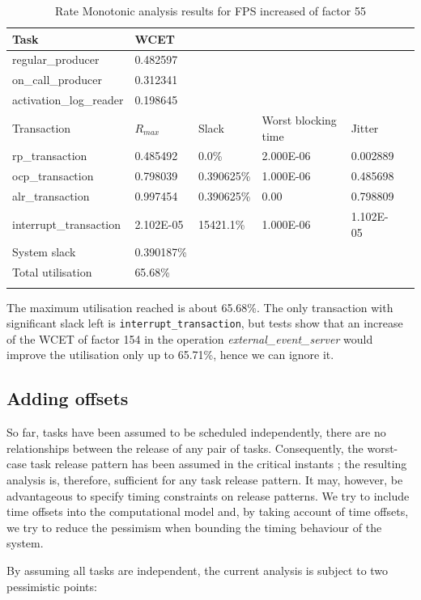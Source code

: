 \documentclass{article}
\begin{document}
\begin{longtable}{llllll}
   \toprule
   Task & WCET \\
   \midrule
   regular\_producer & 0.482597 \\
   on\_call\_producer & 0.312341 \\
   activation\_log\_reader & 0.198645 \\
   \toprule
   \toprule
   Transaction & $R_{max}$ & Slack & Worst blocking time & Jitter \\
   \midrule
   rp\_transaction & 0.485492  & 0.0\% &  2.000E-06 & 0.002889 \\
   ocp\_transaction & 0.798039 & 0.390625\% & 1.000E-06 & 0.485698 \\
   alr\_transaction & 0.997454 & 0.390625\% & 0.00 & 0.798809 \\
   interrupt\_transaction & 2.102E-05 & 15421.1\% & 1.000E-06 & 1.102E-05 \\
   \toprule
   \toprule
   System slack & 0.390187\% \\
   Total utilisation & 65.68\% \\
   \bottomrule
   \caption{Rate Monotonic analysis results for FPS increased of factor 55}
\label{tab:rm-fps-24-ocp-44-alr-56}
\end{longtable}

The maximum utilisation reached is about 65.68\%. The only transaction with significant slack left is \texttt{interrupt\_transaction}, but tests show that an increase of the WCET of factor 154 in the operation \textit{external\_event\_server} would improve the utilisation only up to 65.71\%, hence we can ignore it.

\subsection{Adding offsets}

So far, tasks have been assumed to be scheduled independently, there are no relationships between the release of any pair of tasks. Consequently, the worst-case task release pattern has been assumed in the critical instants \cite{critical-instants}; the resulting analysis is, therefore, sufficient for any task release pattern. It may, however, be advantageous to specify timing constraints on release patterns. We try to include time offsets into the computational model and, by taking account of time offsets, we try to reduce the pessimism when bounding the timing behaviour of the system.

By assuming all tasks are independent, the current analysis is subject to two pessimistic points:
\end{document}
